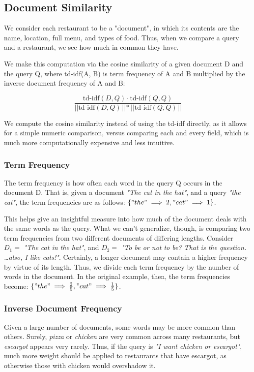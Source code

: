 \documentclass{article}
\begin{document}
    \subsection{Document Similarity}
        We consider each restaurant to be a "document", in which its contents are the name, location, full menu, and types of food. Thus, when we compare a 
query and a restaurant, we see how much in common they have.
        
        We make this computation via the cosine similarity of a given document D and the query Q, where td-idf(A, B) is term frequency of A and B multiplied by 
the inverse document frequency of A and B:
        
        \begin{equation}
            \frac{\text{td-idf}(D, Q) \cdot \text{td-idf}(Q, Q)}{||\text{td-idf}(D, Q) ||*||\text{td-idf}(Q, Q)||}
        \end{equation}
        
        We compute the cosine similarity instead of using the td-idf directly, as it allows for a simple numeric comparison, versus comparing each and every 
field, which is much more computationally expensive and less intuitive.
        
        \subsubsection{Term Frequency}
            The term frequency is how often each word in the query Q occurs in the document D. That is, given a document \textit{"The cat in the hat"}, and a 
query \textit{"the cat"}, the term frequencies are as follows: $\{"the" \implies 2, "cat" \implies 1\}$.
            
            This helps give an insightful measure into how much of the document deals with the same words as the query. What we can't generalize, though, is 
comparing two term frequencies from two different documents of differing lengths. Consider $D_1 = $ \textit{"The cat in the hat"}, and $D_2 = $ \textit{"To be 
or not to be? That is the question. \ldots also, I like cats!"}. Certainly, a longer document may contain a higher frequency by virtue of its length. Thus, we 
divide each term frequency by the number of words in the document. In the original example, then, the term frequencies become: $\{"the" \implies \frac{2}{5}, 
"cat" \implies \frac{1}{5}\}$.
            
        \subsubsection{Inverse Document Frequency}
            Given a large number of documents, some words may be more common than others. Surely, \textit{pizza} or \textit{chicken} are very common across many 
restaurants, but  \textit{escargot} appears very rarely. Thus, if the query is \textit{"I want chicken or escargot"}, much more weight should be applied to 
restaurants that have escargot, as otherwise those with chicken would overshadow it.
            
\end{document}
